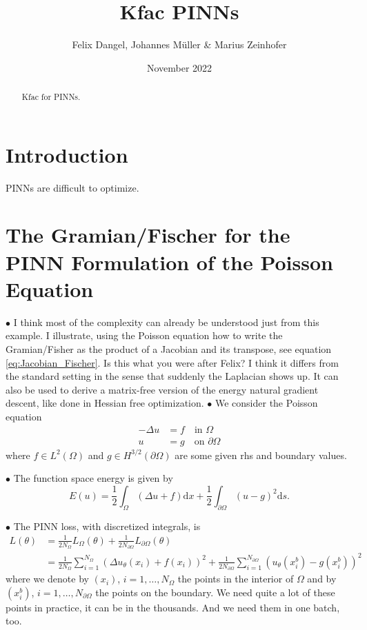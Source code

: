 \documentclass[11pt]{article}
\title{Kfac PINNs }
\date{November 2022}
\author{Felix Dangel, Johannes M\"uller \& Marius Zeinhofer}
\theoremstyle{definition}
\theoremstyle{plain}
\begin{document}
\maketitle

\begin{abstract}
    Kfac for PINNs. 
\end{abstract}
\section{Introduction}
PINNs are difficult to optimize.

\section{The Gramian/Fischer for the PINN Formulation of the Poisson Equation}
$\bullet$ I think most of the complexity can already be understood just from this example. I illustrate, using the Poisson equation how to write the Gramian/Fisher as the product of a Jacobian and its transpose, see equation \eqref{eq:Jacobian_Fischer}. Is this what you were after Felix? I think it differs from the standard setting in the sense that suddenly the Laplacian shows up. It can also be used to derive a matrix-free version of the energy natural gradient descent, like done in Hessian free optimization.
$\bullet$ We consider the Poisson equation
\begin{align*}
    -\Delta u & = f \quad \text{in }\Omega \\
     u & = g \quad \text{on }\partial\Omega
\end{align*}
where $f\in L^2(\Omega)$ and $g\in H^{3/2}(\partial\Omega)$ are some given rhs and boundary values.

$\bullet$ The function space energy is given by
\[ E(u) = \frac{1}{2} \int_\Omega (\Delta u + f) \mathrm dx + \frac12 \int_{\partial\Omega} (u-g)^2 \mathrm ds. \]

$\bullet$ The PINN loss, with discretized integrals, is
\begin{align*}
    L(\theta) 
    &=
    \frac{1}{2N_\Omega} L_\Omega(\theta) + \frac{1}{2N_{\partial\Omega}}L_{\partial\Omega}(\theta)
    \\
    &=
    \frac{1}{2N_\Omega} \sum_{i=1}^{N_\Omega} (\Delta u_\theta(x_i) + f(x_i))^2 + \frac{1}{2N_{\partial\Omega}}\sum_{i=1}^{N_{\partial\Omega}} ( u_\theta(x^b_i) - g(x^b_i))^2
\end{align*}
where we denote by $(x_i)$, $i=1,\dots,N_\Omega$ the points in the interior of $\Omega$ and by $(x^b_i)$, $i=1,\dots,N_{\partial\Omega}$ the points on the boundary. We need quite a lot of these points in practice, it can be in the thousands. And we need them in one batch, too.
\end{document}
